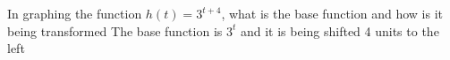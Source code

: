 {In graphing the function $h(t)=3^{t+4}$, what is the base function and how is it being transformed}
{The base function is $3^t$ and it is being shifted 4 units to the left}
